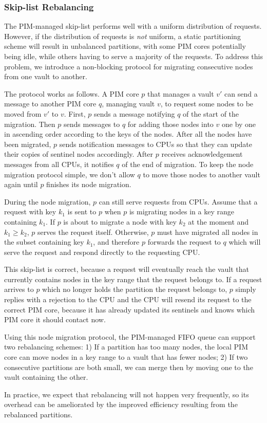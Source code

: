 \subsubsection{Skip-list Rebalancing}
The PIM-managed skip-list performs well with a uniform distribution of requests.
However, if the distribution of requests is \emph{not} uniform, a static partitioning scheme 
will result in unbalanced partitions, with some PIM cores potentially being idle, while others having to 
serve a majority of the requests. To address this problem, we introduce a non-blocking protocol for 
migrating consecutive nodes from one vault to another. 

The protocol works as follows. 
A PIM core $p$ that manages a vault $v'$ can send a message to another PIM core $q$, managing vault 
$v$, to request some nodes to be moved from $v'$ to $v$. 
First, $p$ sends a message notifying $q$ of the start of the migration. 
Then $p$ sends messages to $q$ for adding those nodes into $v$ one by one in ascending order 
according to the keys of the nodes. 
After all the nodes have been migrated, $p$ sends notification messages to CPUs so that 
they can update their copies of sentinel nodes accordingly.
After $p$ receives acknowledgement messages from all CPUs, it notifies $q$ of the end of migration.
To keep the node migration protocol simple, we don't allow $q$ to move those nodes 
to another vault again until $p$ finishes its node migration. 

During the node migration, $p$ can still serve requests from CPUs.
Assume that a request with key $k_1$ is sent to $p$ when $p$ is migrating nodes 
in a key range containing $k_1$.  
If $p$ is about to migrate a node with key $k_2$ at the moment and $k_1 \ge k_2$, 
$p$ serves the request itself. 
Otherwise, $p$ must have migrated all nodes in the subset containing key $k_1$, and therefore $p$ 
forwards the request to $q$ which will serve the request and respond directly to the requesting CPU. 

This skip-list is correct, because a request will eventually reach the vault that 
currently contains nodes in the key range that the request belongs to. 
If a request arrives to $p$ which no longer holds the partition the request belongs to, 
$p$ simply replies with a rejection to the CPU and the CPU will resend its request to 
the correct PIM core, 
because it has already updated its sentinels and knows which PIM core it should contact now. 

Using this node migration protocol, the PIM-managed FIFO queue can support two rebalancing schemes:
1) If a partition has too many nodes, the local PIM core can move nodes in a key range to a vault 
that has fewer nodes;
2) If two consecutive partitions are both small, 
we can merge then by moving one to the vault containing the other. 

In practice, we expect that rebalancing will not happen very frequently, so its overhead can be 
ameliorated by the improved efficiency resulting from the rebalanced partitions. 

